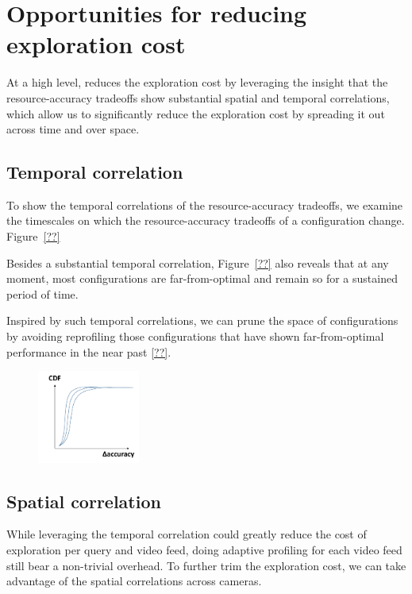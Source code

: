 \section{Opportunities for reducing exploration cost}
At a high level, \name reduces the exploration cost by leveraging the
insight that the resource-accuracy tradeoffs show substantial spatial
and temporal correlations, which allow us to significantly reduce the
exploration cost by spreading it out across time and over space.

\subsection{Temporal correlation}

To show the temporal correlations of the resource-accuracy tradeoffs, 
we examine the timescales on which the resource-accuracy tradeoffs 
of a configuration change. 
Figure~\ref{??} 

Besides a substantial temporal correlation, Figure~\ref{??} also
reveals that at any moment, most configurations are far-from-optimal
and remain so for a sustained period of time.

Inspired by such temporal correlations, we can prune the space of 
configurations by avoiding reprofiling those configurations that have
shown far-from-optimal performance in the near past \Section\ref{??}.

\begin{figure}[h!]
\centering
\includegraphics[width=0.3\textwidth]{figures/TemporalCorrelation.pdf}
\vspace{-0.2cm}
\label{fig:TemporalCorrelation}
\end{figure}

\subsection{Spatial correlation}

While leveraging the temporal correlation could greatly reduce the 
cost of exploration per query and video feed, doing adaptive 
profiling for each video feed still bear a non-trivial overhead.
To further trim the exploration cost, we can take advantage of 
the spatial correlations across cameras. 

